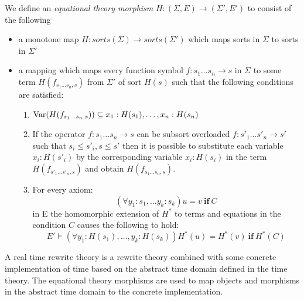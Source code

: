 \begin{mydef}
 We define an \emph{equational theory morphism} $H: (\Sigma,E) \to (\Sigma', E')$ to consist of the following
\begin{itemize}
\item a monotone map $H:sorts(\Sigma) \to sorts(\Sigma')$ which maps  sorts in $\Sigma$  to sorts in $\Sigma'$

\item a mapping which maps every function symbol $f : s_1 \ldots s_n \to s$ in $\Sigma$ to some term $H(f_{s_1 \ldots s_n, s})$ from $\Sigma'$ of sort $H(s)$ such that the following conditions are satisfied:
\begin{enumerate}

\item  $\mathrm{Var}(H(f_{s_1 \ldots s_n, s})) \subseteq {x_1:H(s_1), \ldots, x_n:H(s_n)}$

\item If the operator $f: s_1 \ldots s_n \to s$ can be subsort overloaded $f: s'_1 \ldots s'_n \to s'$ such that $s_i \leq s'_i, s\leq s'$ then it is possible to substitute each variable $x_i:H(s'_i)$ by the corresponding variable $x_i:H(s_i)$ in the term $H(f_{s'_1 \ldots s'_n, s})$ and obtain $H(f_{s_1 \ldots s_n, s})$.

\item For every axiom: $$(\forall y_1:s_1, \ldots y_k : s_k) u = v \ \textbf{if} \ C$$ in E the homomorphic extension of $H^*$ to terms and equations in the condition $C$ causes the following to hold:
   $$E' \models (\forall y_1 : H(s_1), \ldots, y_k : H(s_k)) H^*(u) = H^*(v) \ \textbf{if} \ H^*(C)$$
\end{enumerate}

\end{itemize}

\end{mydef}
\medskip

A real time rewrite theory is a rewrite theory combined with some concrete implementation of time based on the abstract time domain defined in the time theory. The equational theory morphisms are used to map objects and morphisms in the abstract time domain to the concrete implementation.

